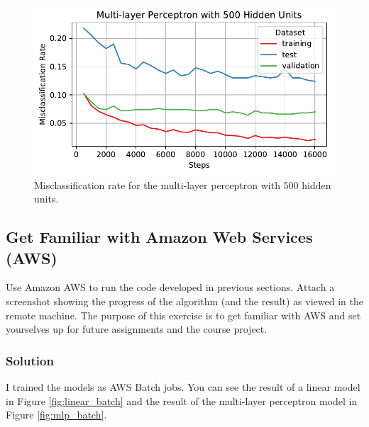\documentclass[letterpaper,11pt]{article}
\begin{document}
\begin{enumerate}
    \begin{figure}
      \centering
      \includegraphics{problem6/mlp500_misclassification.pdf}
      \caption{Misclassification rate for the multi-layer perceptron with 500 hidden units.}
      \label{fig:mlp500_misclassification}
    \end{figure}

  
\end{enumerate}


\subsection*{Get Familiar with Amazon Web Services (AWS)}

Use Amazon AWS to run the code developed in previous sections. Attach a
screenshot showing the progress of the algorithm (and the result) as viewed in
the remote machine. The purpose of this exercise is to get familiar with AWS
and set yourselves up for future assignments and the course project.

\subsubsection*{Solution}

I trained the models as AWS Batch jobs. You can see the result of a linear model
in Figure \ref{fig:linear_batch} and the result of the multi-layer perceptron
model in Figure \ref{fig:mlp_batch}.
\end{document}
